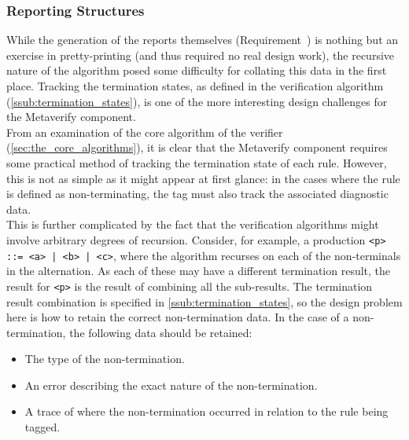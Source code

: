
\subsubsection{Reporting Structures} %
\label{ssub:reporting_structures}

While the generation of the reports themselves (Requirement~) is nothing but an exercise in pretty-printing (and thus required no real design work), the recursive nature of the algorithm posed some difficulty for collating this data in the first place. 
Tracking the termination states, as defined in the verification algorithm (\autoref{ssub:termination_states}), is one of the more interesting design challenges for the Metaverify component.\\

From an examination of the core algorithm of the verifier (\autoref{sec:the_core_algorithms}), it is clear that the Metaverify component requires some practical method of tracking the termination state of each rule. 
However, this is not as simple as it might appear at first glance: in the cases where the rule is defined as non-terminating, the tag must also track the associated diagnostic data. \\

This is further complicated by the fact that the verification algorithms might involve arbitrary degrees of recursion. 
Consider, for example, a production \texttt{<p> ::= <a> | <b> | <c>}, where the algorithm recurses on each of the non-terminals in the alternation. 
As each of these may have a different termination result, the result for \texttt{<p>} is the result of combining all the sub-results. 
The termination result combination is specified in \autoref{ssub:termination_states}, so the design problem here is how to retain the correct non-termination data. 
In the case of a non-termination, the following data should be retained:
\begin{itemize}
    \item The type of the non-termination.
    \item An error describing the exact nature of the non-termination.
    \item A trace of where the non-termination occurred in relation to the rule being tagged. 
\end{itemize}

